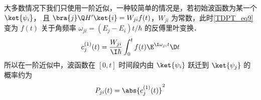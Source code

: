 大多数情况下我们只使用一阶近似，一种较简单的情况是，若初始波函数为某一个 $\ket{\psi_i}$， 且 $\bra{j}\Q H'\ket{i} = W_{ji}f(t)$，$W_{ji}$ 为常数，此时\autoref{TDPT_eq9} 变为 $f(t)$ 关于角频率 $\omega_{ji} = (E_j-E_i)t/\hbar$ 的反傅里叶变换．
\begin{equation}
c_j^{(1)}(t) = \frac{W_{ji}}{\I\hbar}\int_0^t f(t)\E^{\I\omega_{ji} t} \D t
\end{equation}
所以在一阶近似中，波函数在 $[0,t]$ 时间段内由 $\ket{\psi_i}$ 跃迁到 $\ket{\psi_j}$ 的概率约为
\begin{equation}
P_{ji}(t) = \abs{c_j^{(1)}(t)}^2
\end{equation}
